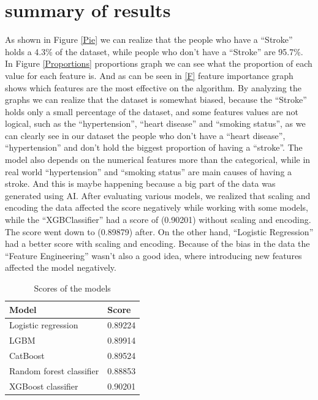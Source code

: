 \documentclass{article}
\begin{document}
  

\section{summary of results}
As shown in Figure \ref{Pie} we can realize that the people who have a “Stroke” holds a 4.3\% of the dataset, while people who don’t have a “Stroke” are 95.7\%. In Figure \ref{Proportions} proportions graph we can see what the proportion of each value for each feature is. And as can be seen in \ref{F} feature importance graph shows which features are the most effective on the algorithm.
By analyzing the graphs we can realize that the dataset is somewhat biased, because the “Stroke” holds only a small percentage of the dataset, and some features values are not logical, such as the “hypertension”, “heart disease” and “smoking status”, as we can clearly see in our dataset the people who don’t have a “heart disease”,  “hypertension” and don’t hold the biggest proportion of having a “stroke”.  The model also depends on the numerical features more than the categorical, while in real world “hypertension” and “smoking status” are main causes of having a stroke. And this is maybe happening because a big part of the data was generated using AI.
After evaluating various models, we realized that scaling and encoding the data affected the score negatively while working with some models, while the “XGBClassifier” had a score of (0.90201) without scaling and encoding. The score went down to (0.89879) after. On the other hand, “Logistic Regression” had a better score with scaling and encoding. Because of the bias in the data the “Feature Engineering” wasn’t also a good idea, where introducing new features affected the model negatively.

\begin{table}[h]
  \caption{Scores of the models}
  \label{sample-table}
  \centering
  \begin{tabular}{ll}
    \toprule
    Model & Score \\
    \midrule
    Logistic regression & 0.89224 \\
    LGBM & 0.89914\\
    CatBoost & 0.89524 \\
    Random forest classifier & 0.88853 \\
    XGBoost classifier & 0.90201 \\
    \bottomrule
  \end{tabular}
\end{table}
\end{document}
